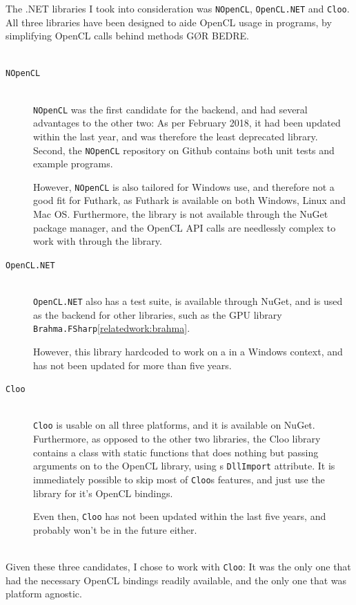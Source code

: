 The .NET libraries I took into consideration was \texttt{NOpenCL}, \texttt{OpenCL.NET} and \texttt{Cloo}.
All three libraries have been designed to aide OpenCL usage in \csharp{}
programs, by simplifying OpenCL calls behind methods GØR BEDRE.
\\
\\
\begin{description}
\item[\texttt{NOpenCL}]\hfill\\
\texttt{NOpenCL} was the first candidate for the \csharp{} backend, and had
several advantages to the other two: As per February 2018, it had been updated
within the last year, and was therefore the least deprecated library. Second,
the \texttt{NOpenCL} repository on Github contains both unit tests and
example programs.

However, \texttt{NOpenCL} is also tailored for Windows use, and therefore not a
good fit for Futhark, as Futhark is available on both Windows, Linux and Mac OS.
Furthermore, the library is not available through the NuGet
package manager, and the OpenCL API calls are needlessly complex to work with
through the library.

\item[\texttt{OpenCL.NET}]\hfill\\
\texttt{OpenCL.NET} also has a test suite, is available through NuGet, and is
used as the backend for other libraries, such as the \fsharp{} GPU library
\texttt{Brahma.FSharp}\ref{relatedwork:brahma}.

However, this library hardcoded to work on a in a Windows context, and has not been
updated for more than five years.

\item[\texttt{Cloo}]\hfill\\
\texttt{Cloo} is usable on all three
platforms, and it is available on NuGet. Furthermore, as opposed to the other two libraries, the
Cloo library contains a class with static functions that does nothing but
passing arguments on to the OpenCL library, using \csharp{}s \texttt{DllImport}
attribute. It is immediately possible to skip most of \texttt{Cloo}s features,
and just use the library for it's OpenCL bindings.

Even then, \texttt{Cloo} has not been updated within the last five years, and
probably won't be in the future either.
\\
\\
\end{description}
Given these three candidates, I chose to work with \texttt{Cloo}: It was the
only one that had the necessary OpenCL bindings readily available, and the only
one that was platform agnostic.

